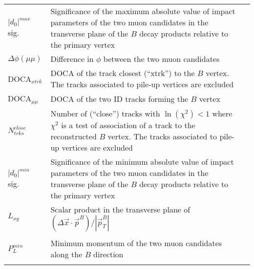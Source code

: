 \begin{tabular}{p{2cm} p{10.9cm} p{2.1cm}}
$|d_{0}|^{max}$ sig. & Significance of the maximum absolute value of impact
parameters of the two muon candidates in the transverse plane of the $B$
decay products relative to the primary vertex \\  
$\Delta\phi(\mu\mu)$ & Difference in $\phi$ between the two muon candidates  \\  
DOCA$_{xtrk}$ & DOCA of the track closest (``xtrk'') to the $B$ vertex.
The tracks associated to pile-up vertices are excluded \\  
DOCA$_{\mu\mu}$ & DOCA of the two ID tracks forming the $B$ vertex  \\  
$N^{close}_{trks}$ & Number of (``close'') tracks with $\ln(\chi^2)<1$ where
$\chi^2$ is a test of association of a track to the reconstructed $B$ vertex.
The tracks associated to pile-up vertices are excluded\\  
$|d_{0}|^{min}$ sig. & Significance of the minimum absolute value of impact
parameters of the two muon candidates in the transverse plane of the $B$
decay products relative to the primary vertex\\  
$L_{xy}$ & Scalar product in the transverse plane of
$(\Delta\overrightarrow{x}\cdot\overrightarrow{p}^{B})/|\overrightarrow{p}^{B}_{T}|$\\ \\  
$P_{L}^{min}$ & Minimum momentum of the two muon candidates
along the $B$ direction\\ \\
\hline \hline
\end{tabular}